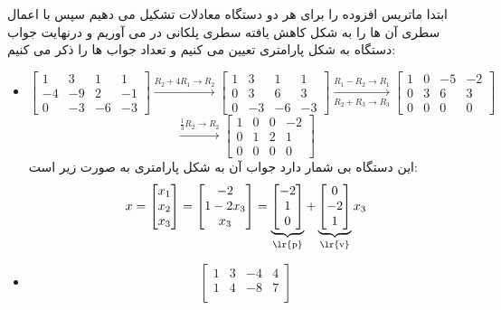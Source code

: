 \documentclass{article}
\begin{document}
\begin{حل}
	ابتدا ماتریس افزوده را برای هر دو دستگاه معادلات تشکیل می دهیم سپس با اعمال سطری آن ها را به شکل کاهش یافته سطری پلکانی در می آوریم و درنهایت جواب دستگاه به شکل پارامتری تعیین می کنیم و تعداد جواب ها را ذکر می کنیم:
	\begin{itemize}
		\item
$$	\begin{bmatrix}
		1&3&1&1\\
		-4&-9&2&-1\\
		0&-3&-6&-3
	\end{bmatrix}\xrightarrow{R_2+4R_1\to R_2}
	\begin{bmatrix}
		1&3&1&1\\
	0&3&6&3\\
	0&-3&-6&-3
	\end{bmatrix}\xrightarrow[R_2+R_3\to R_3]{R_1-R_2\to R_1}	
	\begin{bmatrix}
	1&0&-5&-2\\
	0&3&6&3\\
	0&0&0&0
	\end{bmatrix}
	$$
	$$\xrightarrow{\frac{1}{3}R_2\to R_2}
	\begin{bmatrix}
	1&0&0&-2\\
	0&1&2&1\\
	0&0&0&0
	\end{bmatrix}
	$$
	این دستگاه بی شمار دارد جواب آن به شکل پارامتری به صورت زیر است:
	$$x=\begin{bmatrix}
	x_1\\
	x_2\\
	x_3
	\end{bmatrix}
	={\begin{bmatrix}
		-2\\
		1-2x_3\\
		x_3
		\end{bmatrix}}
	=
		\underbrace{\begin{bmatrix}
		-2\\
		1\\
		0
		\end{bmatrix}}_\text{\lr{p}}+
	\underbrace{\begin{bmatrix}
		0\\
		-2\\
		1
		\end{bmatrix}}_\text{\lr{v}}x_3$$
	\item 
	$$\begin{bmatrix}
		1&3&-4&4\\
		1&4&-8&7\\

\end{bmatrix}$$
\end{itemize}
\end{حل}
\end{document}
